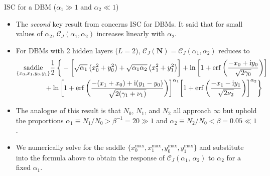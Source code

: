 \documentclass[8pt]{beamer}
\begin{document}
\begin{frame}[label={sec:orgb02b4c9}]{ISC for a DBM (\(\alpha_1 \gg 1\) and \(\alpha_{2} \ll 1\))}
\begin{itemize}
\item The \emph{second} key result from \cite{bansal2018using} concerns ISC for DBMs. It said that for small values of \(\alpha_{2}\), \(\mathcal{C}_{J} (\alpha_{1}, \alpha_{2})\) increases linearly with \(\alpha_{2}\).
\linebreak
\item For DBMs with 2 hidden layers (\(L = 2\)), \(\mathcal{C}_J (\boldsymbol{N}) = \mathcal{C}_{J} (\alpha_{1}, \alpha_{2})\) reduces to
 \begin{align*}
 &\underset{\{x_{0}, x_{1}, y_{0}, y_{1}\}}{\operatorname{saddle}} \frac{1}{2} \thinspace \bigg \{- \bigg[ \sqrt{\alpha_{1}} \thinspace \big(x_{0}^{2} + y_{0}^{2} \big) + \sqrt{\alpha_{1} \alpha_{2}} \thinspace \big(x_{1}^{2} + y_{1}^{2} \big) \bigg] + \ln \bigg [1 + \operatorname{erf} \bigg(\frac{- x_{0} + \mathrm{i} y_{0}}{\sqrt{2 \gamma_{0}}} \bigg) \bigg] \\
 &\qquad \qquad + \ln \bigg [1 + \operatorname{erf} \bigg(\frac{- (x_{1} + x_{0}) + \mathrm{i} (y_{1} - y_{0})}{\sqrt{2 (\gamma_{1} + \nu_{1})}} \bigg) \bigg]^{\alpha_{1}} \bigg [1 + \operatorname{erf} \bigg(\frac{- x_{1} - \mathrm{i} y_{1}}{\sqrt{2 \nu_{2}}} \bigg) \bigg]^{\alpha_{2}} \bigg \}
\end{align*}
\linebreak
\item The analogue of this result is that \(N_{0}\), \(N_{1}\), and \(N_{2}\) all approach \(\infty\) but uphold the proportions \(\alpha_{1} \equiv N_{1} / N_{0} > \beta^{-1} = 20 \gg 1\) and \(\alpha_{2} \equiv N_{2} / N_{0} < \beta = 0.05 \ll 1\).
\linebreak
\item We numerically solve for the saddle \(\{x^{\text{max}}_{0}, x^{\text{max}}_{1},  y^{\text{max}}_{0}, y^{\text{max}}_{1}\}\) and substitute into the formula above to obtain the response of \(\mathcal{C}_{J} (\alpha_{1},\,\alpha_{2})\) to \(\alpha_{2}\) for a fixed \(\alpha_{1}\).
\end{itemize}
\end{frame}
\end{document}
